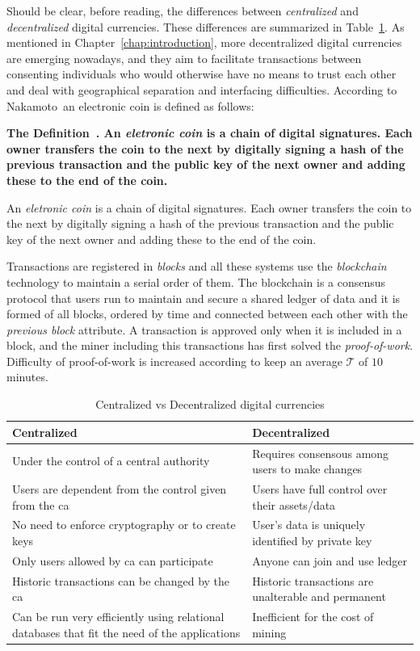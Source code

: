 \documentclass[USenglish]{uit-thesis}
\newcommand{\definition}[1]{%
  \refstepcounter{definition}%
  \par\noindent\textbf{The Definition~\thedefinition. #1}%
  \addcontentsline{def}{definition}
    {\protect\numberline{\thechapter.\thedefinition}#1}\par%
}
\begin{document}
Should be clear, before reading, the differences
between \emph{centralized} and \emph{decentralized} digital currencies.
These differences are summarized in Table~\ref{tab:centralized_vs_decentralized}.
As mentioned in Chapter~\ref{chap:introduction}, more decentralized
digital currencies are emerging nowadays, and they aim
to facilitate transactions between consenting individuals who would otherwise
have no means to trust each other and deal with geographical separation and 
interfacing difficulties.
According to Nakamoto\,\cite{Nakamoto_bitcoin} an electronic coin is defined as
follows:
\definition{An \emph{eletronic coin} is a chain of digital signatures.
	Each owner transfers the coin to the next by digitally signing a hash of
	the previous transaction and the public key of the next owner and adding
	these to the end of the coin.}
Transactions are registered in \emph{blocks} and all these systems use the
\emph{blockchain} technology to maintain a serial order of them.
The blockchain is a consensus protocol that users run to maintain and secure a
shared ledger of data and it is formed of all blocks, ordered by time and connected
between each other with the \emph{previous block} attribute. A transaction is approved
only when it is included in a block, and the miner including this transactions has first
solved the \emph{proof-of-work}. Difficulty of proof-of-work is increased
according to keep an average $\mathcal{T}$ of $10$\,minutes.
\begin{table}
	\caption{Centralized vs Decentralized digital currencies}
	\label{tab:centralized_vs_decentralized}
	\centering 
	\begin{tabular}{|p{5.8cm}|p{5.8cm}|}\hline
		\textbf{Centralized}&\textbf{Decentralized}\\
		\hline
		Under the control of a central authority & Requires
		consensous among users to make changes\\
		\hline
		Users are dependent from the control given from the
		\gls{ca} & Users have full control over their assets/data\\
		\hline
		No need to enforce cryptography or to create keys & User’s data is uniquely identified by private key \\
		\hline
		Only users allowed by \gls{ca} can participate & Anyone can join and use ledger \\
		\hline
		Historic transactions can be changed by the \gls{ca} &
		Historic transactions are unalterable and permanent\\
		\hline
		Can be run very efficiently using relational
		databases that fit the need of the applications & Inefficient
		for the cost of mining \\
		\hline		
	\end{tabular}
\end{table}
\end{document}

